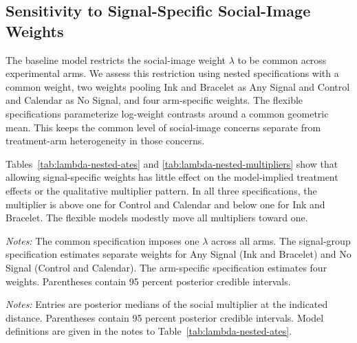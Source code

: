 \documentclass[12pt]{article}
\begin{document}
\providecommand{\StructuralRobustnessPath}{appendix/structural-robustness}

\subsection{Sensitivity to Signal-Specific Social-Image Weights}
\label{app:signal-specific-lambda}

The baseline model restricts the social-image weight $\lambda$ to be common
across experimental arms. We assess this restriction using nested
specifications with a common weight, two weights pooling Ink and Bracelet as
Any Signal and Control and Calendar as No Signal, and four arm-specific
weights. The flexible specifications parameterize log-weight contrasts around
a common geometric mean. This keeps the common level of social-image concerns
separate from treatment-arm heterogeneity in those concerns.

Tables~\ref{tab:lambda-nested-ates} and
\ref{tab:lambda-nested-multipliers} show that allowing signal-specific weights
has little effect on the model-implied treatment effects or the qualitative
multiplier pattern. In all three specifications, the multiplier is above one
for Control and Calendar and below one for Ink and Bracelet. The flexible
models modestly move all multipliers toward one.

\begin{table}[htbp]
  \centering
  \small
  \caption{Structural treatment effects under alternative social-image weights}
  \label{tab:lambda-nested-ates}
  
  \begin{minipage}{0.93\linewidth}
    \vspace{0.4em}\footnotesize
    \textit{Notes:} The common specification imposes one $\lambda$ across all
    arms. The signal-group specification estimates separate weights for Any
    Signal (Ink and Bracelet) and No Signal (Control and Calendar). The
    arm-specific specification estimates four weights. Parentheses contain
    95 percent posterior credible intervals.
  \end{minipage}
\end{table}

\begin{table}[htbp]
  \centering
  \small
  \caption{Social multipliers under alternative social-image weights}
  \label{tab:lambda-nested-multipliers}
  
  \begin{minipage}{0.93\linewidth}
    \vspace{0.4em}\footnotesize
    \textit{Notes:} Entries are posterior medians of the social multiplier at
    the indicated distance. Parentheses contain 95 percent posterior credible
    intervals. Model definitions are given in the notes to
    Table~\ref{tab:lambda-nested-ates}.
  \end{minipage}
\end{table}
\end{document}
